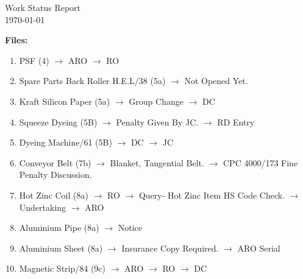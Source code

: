 \documentclass[12pt]{article}
\begin{document}
\small
\begin{center}
    Work Status Report
    \\
    {\today}
\end{center}

\noindent
\textbf{Files:}

\begin{enumerate}
\item
    PSF (4)
$\rightarrow$
ARO
$\rightarrow$
RO

\item
    Spare Parts Back Roller H.E.L/38 (5a)
$\rightarrow$
Not Opened Yet.

\item
    Kraft Silicon Paper (5a)
$\rightarrow$
Group Change
$\rightarrow$
DC

\item
    Squeeze Dyeing (5B)
$\rightarrow$
Penalty Given By JC.
$\rightarrow$
RD Entry

\item
    Dyeing Machine/61 (5B)
$\rightarrow$
DC
$\rightarrow$
JC

\item
    Conveyor Belt (7b)
$\rightarrow$
Blanket, Tangential Belt.
$\rightarrow$
CPC 4000/173 Fine Penalty Discussion.

\item
    Hot Zinc Coil (8a)
$\rightarrow$
RO
$\rightarrow$
Query-
Hot Zinc Item HS Code Check.
$\rightarrow$
Undertaking
$\rightarrow$
ARO

\item
    Aluminium Pipe (8a)
$\rightarrow$
Notice

\item
    Aluminium Sheet (8a)
$\rightarrow$
Insurance Copy Required.
$\rightarrow$
ARO Serial

\item
    Magnetic Strip/84 (9c)
$\rightarrow$
ARO
$\rightarrow$
RO
$\rightarrow$
DC
\end{enumerate}
\end{document}
